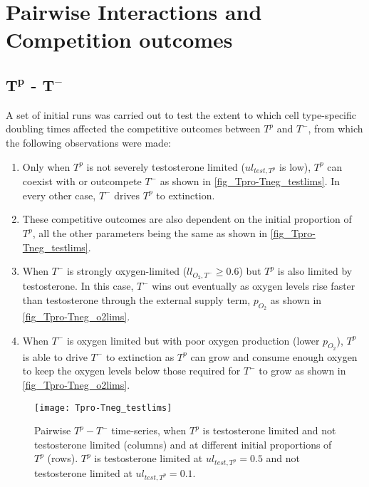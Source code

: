 
\chapter{Pairwise Interactions and Competition outcomes}
\section{$\boldsymbol{T^p}$ - $\boldsymbol{T^-}$}
A set of initial runs was carried out to test the extent to which cell type-specific doubling times affected the competitive outcomes between $T^p$ and $T^-$, from which the following observations were made:
\begin{enumerate}
  \item Only when $T^p$ is not severely testosterone limited ($ul_{test,T^p}$ is low), $T^p$ can coexist with or outcompete $T^-$ as shown in \autoref{fig_Tpro-Tneg_testlims}. In every other case, $T^-$ drives $T^p$ to extinction.
  \item These competitive outcomes are also dependent on the initial proportion of $T^p$, all the other parameters being the same as shown in \autoref{fig_Tpro-Tneg_testlims}.
  \item When $T^-$ is strongly oxygen-limited ($ll_{O_2,T^-} \geq 0.6$) but $T^p$ is also limited by testosterone. In this case, $T^-$ wins out eventually as oxygen levels rise faster than testosterone through the external supply term, $p_{O_2}$ as shown in \autoref{fig_Tpro-Tneg_o2lims}.
  \item When $T^-$ is oxygen limited but with poor oxygen production (lower $p_{O_2}$), $T^p$ is able to drive $T^-$ to extinction as $T^p$ can grow and consume enough oxygen to keep the oxygen levels below those required for $T^-$ to grow as shown in \autoref{fig_Tpro-Tneg_o2lims}.
\end{enumerate}

\begin{figure}[h!]
  \centering
  \texttt{[image: Tpro-Tneg\_testlims]}
  \caption[Pairwise $T^p - T^-$ time-series, testosterone limitation]{Pairwise $T^p - T^-$ time-series, when $T^p$ is testosterone limited and not testosterone limited (columns) and at different initial proportions of $T^p$ (rows). $T^p$ is testosterone limited at $ul_{test,T^p}=0.5$ and not testosterone limited at $ul_{test,T^p}=0.1$.}
  \label{fig_Tpro-Tneg_testlims}
\end{figure}

